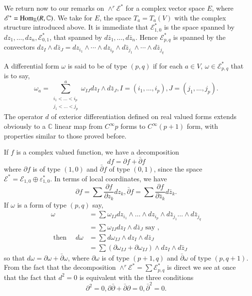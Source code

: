 We return now to our remarks on $\wedge^r \mathscr{E}^*$ for a complex
vector space $E$, where $\mathscr{E}^* = \operatorname{Hom}_\mathbb{R}(R,
\mathbb{C})$. We take for $E$, the space $T_a = T_a (V)$ with the
complex structure introduced above. It is immediate that
$\mathscr{E}^*_{1, 0}$ is the space spanned by $dz_1, \ldots, dz_n,
\mathscr{E}^*_{0, 1}$, that spanned by $d \bar{z}_1, \ldots,
d\bar{z}_n$. Hence $\mathscr{E}^*_{p, q}$ is spanned by the convectors
$ dz_I \wedge d\bar{z}_J =dz_{i_1} \wedge \cdots \wedge dz_{i_p}
\wedge d\bar{z}_{j_1} \wedge \cdots \wedge d \bar{z}_{j_q}$\pageoriginale 

A differential form $\omega$ is said to be of type $(p, q)$ if for
each $a \in V$, $\omega \in \mathscr{E}^*_{p, q}$ that is to say, 
$$
\omega_a = \sum^a_{\substack { i_1 < \ldots < i_p \\ { j_1 < \ldots <
      j_p}}} \omega_{IJ} dz_I \wedge d \bar{z}_J, I = (i_1, \ldots,
i_p), J = (j_1, \ldots, j_p). 
$$
The operator $d$ of exterior differentiation
defined on real valued forms extends obviously to a $\mathbb{C}$
linear map from $C^\infty p$ forms to $C^\infty (p+1)$ form, with
properties similar to those proved before. 

If $f$ is a complex valued function, we have a decomposition 
$$
df = \partial f + \bar{\partial}f
$$
where $\partial f$ is of type $(1, 0)$ and $\bar{\partial}f$ of type
$(0, 1)$, since the space $\mathscr{E}^* = \mathscr{E}_{1, 0} \oplus
\varepsilon^*_{1, 0}$. In terms of local coordinates, we have  
$$
\partial f = \sum \frac{\partial f}{\partial z_k} dz_k,
\bar{\partial}f = \sum \frac{\partial f}{\partial \bar{z}_k} d
\bar{z}_k. 
$$
If $\omega$ is a form of type $(p, q)$ say, 
\begin{align*}
  \omega & = \sum \omega_{IJ} dz_{i_1} \wedge \ldots \wedge dz_{i_p}
  \wedge d \bar{z}_{j_1}\ldots \wedge d \bar{z}_{j_q} \\ 
  & = \sum \omega_{IJ} dz_I \wedge d\bar{z}_J \text{ say },\\
  \text{ then } \quad d \omega & = \sum d \omega_{IJ} \wedge dz_I
  \wedge d \bar{z}_J \\ 
  & = \sum (\partial \omega_{IJ}+ \partial \omega_{IJ}) \wedge dz_I
  \wedge d \bar{z}_J 
\end{align*} 
so that $d \omega = \partial \omega + \bar{\partial} \omega$, where
$\partial \omega$ is of type $(p+1, q)$ and $\bar{\partial} \omega$ of
type $(p, q+1)$. From the fact that the decomposition $\wedge^r
\mathscr{E}^* = \sum \mathscr{E}^*_{p,q}$ is direct we see at once
that the fact that $d^2 = 0$ is equivalent with the three conditions 
$$
\partial^2 = 0, \partial \bar{\partial} + \bar{\partial} \partial = 0,
\bar{\partial}^2 = 0. 
$$

